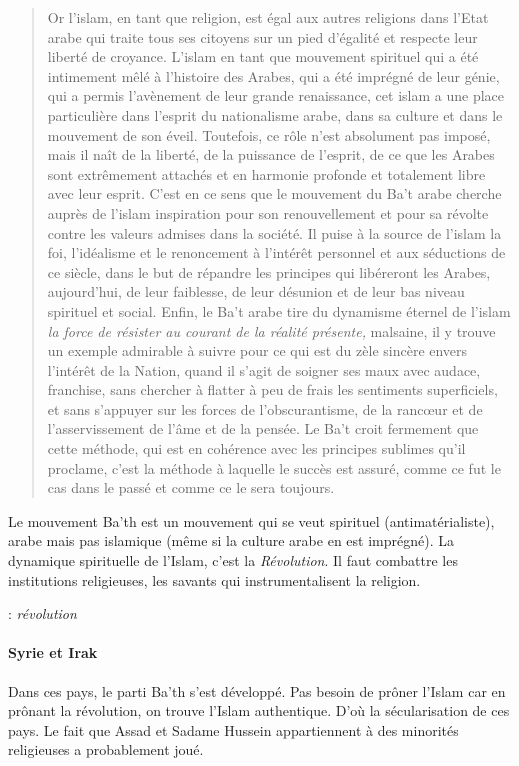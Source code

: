 \begin{quote}
Or l'islam, en tant que religion, est égal aux autres religions dans
l'Etat arabe qui traite tous ses citoyens sur un pied d'égalité et
respecte leur liberté de croyance. L'islam en tant que mouvement
spirituel qui a été intimement mêlé à l'histoire des Arabes, qui a été
imprégné de leur génie, qui a permis l'avènement de leur grande
renaissance, cet islam a une place particulière dans l'esprit du
nationalisme arabe, dans sa culture et dans le mouvement de son éveil.
Toutefois, ce rôle n'est absolument pas imposé, mais il naît de la
liberté, de la puissance de l'esprit, de ce que les Arabes sont
extrêmement attachés et en harmonie profonde et totalement libre avec
leur esprit. C'est en ce sens que le mouvement du Ba't arabe cherche
auprès de l'islam inspiration pour son renouvellement et pour sa révolte
contre les valeurs admises dans la société. Il puise à la source de
l'islam la foi, l'idéalisme et le renoncement à l'intérêt personnel et
aux séductions de ce siècle, dans le but de répandre les principes qui
libéreront les Arabes, aujourd'hui, de leur faiblesse, de leur désunion
et de leur bas niveau spirituel et social. Enfin, le Ba't arabe tire du
dynamisme éternel de l'islam\textit{ la force de résister au courant de la
réalité présente,} malsaine, il y trouve un exemple admirable à suivre
pour ce qui est du zèle sincère envers l'intérêt de la Nation, quand il
s'agit de soigner ses maux avec audace, franchise, sans chercher à
flatter à peu de frais les sentiments superficiels, et sans s'appuyer
sur les forces de l'obscurantisme, de la rancœur et de l'asservissement
de l'âme et de la pensée. Le Ba't croit fermement que cette méthode, qui
est en cohérence avec les principes sublimes qu'il proclame, c'est la
méthode à laquelle le succès est assuré, comme ce fut le cas dans le
passé et comme ce le sera toujours.


\end{quote}

\begin{Synthesis}
  Le mouvement Ba'th est un mouvement qui se veut spirituel (antimatérialiste), arabe mais pas islamique (même si la culture arabe en est imprégné).
  La dynamique spirituelle de l'Islam, c'est la \textit{Révolution}. Il faut combattre les institutions religieuses, les savants qui instrumentalisent la religion. 
\end{Synthesis}
 \begin{Def}[inqilâb]  : \emph{révolution}
\end{Def}
\paragraph{Syrie et Irak} Dans ces pays, le parti Ba'th s'est développé. Pas besoin de prôner l'Islam car en prônant la révolution, on trouve l'Islam authentique. D'où la sécularisation de ces pays. Le fait que Assad et Sadame Hussein appartiennent à des minorités religieuses a probablement joué.  
 ~
 
